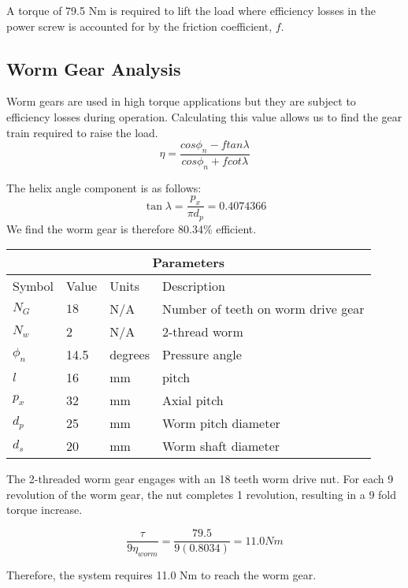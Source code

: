\documentclass[letterpaper,12pt]{article}
\begin{document}
A torque of 79.5 Nm is required to lift the load where efficiency losses in the power screw is accounted for by the friction coefficient, $f$. 
    
\subsection{Worm Gear Analysis}
Worm gears are used in high torque applications but they are subject to efficiency losses during operation. Calculating this value allows us to find the gear train required to raise the load. \\

	\begin{equation}
	\eta = \frac{cos\phi_n - ftan\lambda}{cos\phi_n+fcot\lambda}
	\end{equation}
	
The helix angle component is as follows:
	\begin{equation}
\tan \lambda =  \frac{p_x}{\pi d_p} = 0.4074366
	\end{equation}
We find the worm gear is therefore $80.34 \% $ efficient.
\begin{center}
		\begin{tabular}{ |p{2cm}||p{3cm}|p{2cm}|p{7cm}|  }
			\hline
			\multicolumn{4}{|c|}{Parameters} \\
			\hline
			Symbol& Value & Units & Description\\
			\hline
			$N_G$ & $18$ & N/A & Number of teeth on worm drive gear\\
			$N_w$ & 2 & N/A   & 2-thread worm \\
			$\phi_n$ & 14.5 & degrees &  Pressure angle\\
			$l$ & 16 & mm & pitch\\
			$p_x$ & 32 & mm & Axial pitch\\
			$d_p$ & 25 & mm & Worm pitch diameter\\
			$d_s$ & 20 & mm & Worm shaft diameter\\
			\hline
		\end{tabular}
	\end{center}

The 2-threaded worm gear engages with an 18 teeth worm drive nut. For each 9 revolution of the worm gear, the nut completes 1 revolution, resulting in a 9 fold torque increase. 

$$\frac{\tau }{9 \eta_{worm}} = \frac{79.5}{9(0.8034)} = 11.0 Nm$$

Therefore, the system requires 11.0 Nm to reach the worm gear. 
\end{document}
